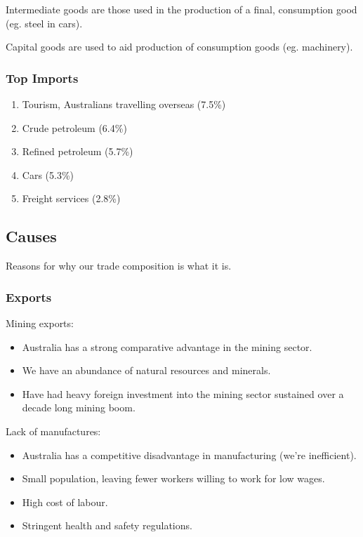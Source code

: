 \documentclass[a4paper,11pt]{report}
\begin{document}
Intermediate goods are those used in the production of a final, consumption
good (eg. steel in cars).

Capital goods are used to aid production of consumption goods (eg. machinery).

\subsubsection{Top Imports}

\begin{enumerate}
\item Tourism, Australians travelling overseas (7.5\%)
\item Crude petroleum (6.4\%)
\item Refined petroleum (5.7\%)
\item Cars (5.3\%)
\item Freight services (2.8\%)
\end{enumerate}

\subsection{Causes}

Reasons for why our trade composition is what it is.

\subsubsection{Exports}

Mining exports:

\begin{itemize}
\item Australia has a strong comparative advantage in the mining sector.
\item We have an abundance of natural resources and minerals.
\item Have had heavy foreign investment into the mining sector sustained over
	a decade long mining boom.
\end{itemize}

Lack of manufactures:

\begin{itemize}
\item Australia has a competitive disadvantage in manufacturing (we're
	inefficient).
\item Small population, leaving fewer workers willing to work for low wages.
\item High cost of labour.
\item Stringent health and safety regulations.
\end{itemize}
\end{document}
